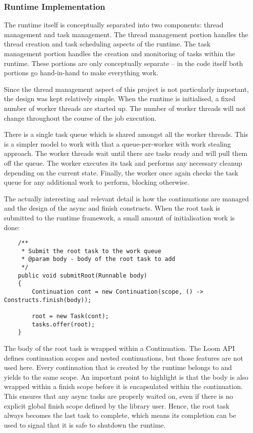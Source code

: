 \documentclass[12pt]{article}
\begin{document}
    \subsubsection{Runtime Implementation}

    The runtime itself is conceptually separated into two components: thread management and task management.
    The thread management portion handles the thread creation and task scheduling aspects of the runtime. The
    task management portion handles the creation and monitoring of tasks within the runtime. These portions
    are only conceptually separate -- in the code itself both portions go hand-in-hand to make everything
    work.

    Since the thread management aspect of this project is not particularly important, the design was kept
    relatively simple. When the runtime is initialised, a fixed number of worker threads are started up. The
    number of worker threads will not change throughout the course of the job execution.

    There is a single task queue which is shared amongst all the worker threads. This is a simpler model to
    work with that a queue-per-worker with work stealing approach. The worker threads wait until there are
    tasks ready and will pull them off the queue. The worker executes its task and performs any necessary
    cleanup depending on the current state. Finally, the worker once again checks the task queue for any
    additional work to perform, blocking otherwise.

    The actually interesting and relevant detail is how the continuations are managed and the design of the
    async and finish constructs. When the root task is submitted to the runtime framework, a small amount of
    initialisation work is done:

    \begin{lstlisting}
    /**
     * Submit the root task to the work queue
     * @param body - body of the root task to add
     */
    public void submitRoot(Runnable body)
    {
        Continuation cont = new Continuation(scope, () -> Constructs.finish(body));

        root = new Task(cont);
        tasks.offer(root);
    }
    \end{lstlisting}

    The body of the root task is wrapped within a Continuation. The Loom API defines continuation scopes and
    nested continuations, but those features are not used here. Every continuation that is created by the
    runtime belongs to and yields to the same scope. An important point to highlight is that the body is also
    wrapped within a finish scope before it is encapsulated within the continuation. This ensures that any
    async tasks are properly waited on, even if there is no explicit global finish scope defined by the
    library user. Hence, the root task always becomes the last task to complete, which means its completion
    can be used to signal that it is safe to shutdown the runtime.
\end{document}
